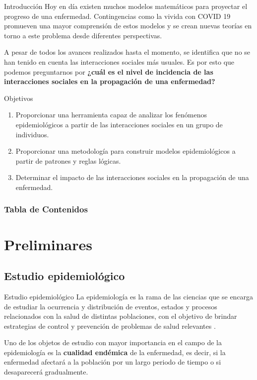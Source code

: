 \documentclass[9pt]{beamer}
\subtitle{\\
\LARGE{CAsimulations: Modelación de dinámicas topológicas } \\
\LARGE{en la propagación de una enfermedad usando}\\
\LARGE{autómatas celulares}}
\author{Jorge Andres Ibañez Huertas, 
Carlos Isaac Zainea Maya}
\institute{Central University, Bogotá}
\date{\today}
\begin{document}
\titlepage

\begin{frame}{Introducción}
Hoy en día existen muchos modelos matemáticos para proyectar el progreso de una enfermedad. Contingencias como la vivida con COVID 19 promueven una mayor comprensión de estos modelos y se crean nuevas teorías en torno a este problema desde diferentes perspectivas.

A pesar de todos los avances realizados hasta el momento, se identifica que no se han tenido en cuenta las interacciones sociales más usuales. Es por esto que podemos preguntarnos por \textbf{¿cuál es el nivel de incidencia de las interacciones sociales en la propagación de una enfermedad?}
\end{frame}

\begin{frame}{Objetivos}
\begin{enumerate}
    \item Proporcionar una herramienta capaz de analizar los fenómenos epidemiológicos a partir de las interacciones sociales en un grupo de individuos.
    \item Proporcionar una metodología para construir modelos epidemiológicos a partir de patrones y reglas lógicas.
    \item Determinar el impacto de las interacciones sociales en la propagación de una enfermedad.
\end{enumerate}
\end{frame}

\begin{frame}
\frametitle{Tabla de Contenidos}
\tableofcontents
\end{frame}

\section{Preliminares}
\subsection{Estudio epidemiológico}
\begin{frame}{Estudio epidemiológico}
La epidemiología es la rama de las ciencias que se encarga de estudiar la ocurrencia y distribución de eventos, estados y procesos relacionados con la salud de distintas poblaciones, con el objetivo de brindar estrategias de control y prevención de problemas de salud relevantes \cite{epiDictionary}.

Uno de los objetos de estudio con mayor importancia en el campo de la epidemiología es la \textbf{cualidad endémica} de la enfermedad, es decir, si la enfermedad afectará a la población por un largo periodo de tiempo o si desaparecerá gradualmente. 
\end{frame}
\end{document}
